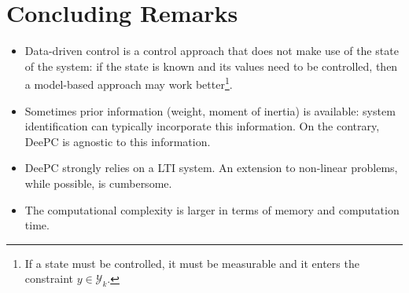 \section{Concluding Remarks}
\label{sec:deepc-concluding-remarks}

\begin{itemize}
\item Data-driven control is a control approach that does not make use of the state of the system: if the state is known and its values need to be controlled, then a model-based approach may work better\footnote{If a state must be controlled, it must be measurable and it enters the constraint $y\in \mathcal{Y}_k$.}.
\item Sometimes prior information (weight, moment of inertia) is available: system identification can typically incorporate this information. On the contrary, DeePC is agnostic to this information.
\item DeePC strongly relies on a LTI system. An extension to non-linear problems, while possible, is cumbersome.
\item The computational complexity is larger in terms of memory and computation time.
\end{itemize}


